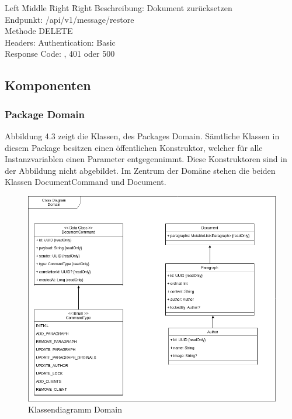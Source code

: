 \begin{tabbing}
    Left \= Middle \= Right \= Right \kill
    Beschreibung:  \> \> \> Dokument zurücksetzen \\
    Endpunkt:  \> \> \> /api/v1/message/restore\\
    Methode \>  \> \> DELETE\\
    Headers:  \> \>   \> Authentication: Basic\\
    Response Code:  \> \>  , 401 oder 500 \\
\end{tabbing}

\clearpage

\subsection{Komponenten}\label{subsec:komponenten}

\subsubsection{Package Domain}

Abbildung 4.3 zeigt die Klassen, des Packages Domain.
Sämtliche Klassen in diesem Package besitzen einen öffentlichen Konstruktor, welcher für alle Instanzvariablen einen Parameter entgegennimmt.
Diese Konstruktoren sind in der Abbildung nicht abgebildet.
Im Zentrum der Domäne stehen die beiden Klassen DocumentCommand und Document.

\begin{figure}[h]
    \centering
    \begin{minipage}[b]{0.8\textwidth}
        \includegraphics[width=\textwidth]{images/class-be-domain.drawio}
        \caption{Klassendiagramm Domain}
    \end{minipage}
\end{figure}

